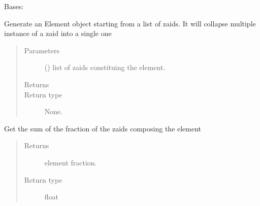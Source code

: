 \documentclass[letterpaper,10pt,english]{sphinxmanual}
\begin{document}
\begin{fulllineitems}
\label{\detokenize{api/inputgeneration:matreader.Element}}
Bases: 

Generate an Element object starting from a list of zaids.
It will collapse multiple instance of a zaid into a single one
\begin{quote}\begin{description}
\item[{Parameters}] \leavevmode
{} () \textendash{} list of zaids constituing the element.

\item[{Returns}] \leavevmode


\item[{Return type}] \leavevmode
None.

\end{description}\end{quote}

\begin{fulllineitems}
\label{\detokenize{api/inputgeneration:matreader.Element.get_fraction}}
Get the sum of the fraction of the zaids composing the element
\begin{quote}\begin{description}
\item[{Returns}] \leavevmode
{} \textendash{} element fraction.

\item[{Return type}] \leavevmode
float

\end{description}\end{quote}

\end{fulllineitems}



\end{fulllineitems}
\end{document}
